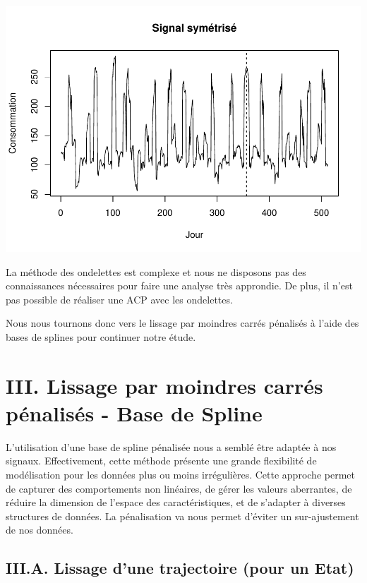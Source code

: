 \documentclass[
]{article}
\begin{document}
\includegraphics{Projet_CHESNAIS_GUIBERT_files/figure-latex/unnamed-chunk-20-2.pdf}

La méthode des ondelettes est complexe et nous ne disposons pas des
connaissances nécessaires pour faire une analyse très approndie. De
plus, il n'est pas possible de réaliser une ACP avec les ondelettes.

Nous nous tournons donc vers le lissage par moindres carrés pénalisés à
l'aide des bases de splines pour continuer notre étude.

\hypertarget{iii.-lissage-par-moindres-carruxe9s-puxe9nalisuxe9s---base-de-spline}{%
\section{III. Lissage par moindres carrés pénalisés - Base de
Spline}\label{iii.-lissage-par-moindres-carruxe9s-puxe9nalisuxe9s---base-de-spline}}

L'utilisation d'une base de spline pénalisée nous a semblé être adaptée
à nos signaux. Effectivement, cette méthode présente une grande
flexibilité de modélisation pour les données plus ou moins irrégulières.
Cette approche permet de capturer des comportements non linéaires, de
gérer les valeurs aberrantes, de réduire la dimension de l'espace des
caractéristiques, et de s'adapter à diverses structures de données. La
pénalisation va nous permet d'éviter un sur-ajustement de nos données.

\hypertarget{iii.a.-lissage-dune-trajectoire-pour-un-etat}{%
\subsection{III.A. Lissage d'une trajectoire (pour un
Etat)}\label{iii.a.-lissage-dune-trajectoire-pour-un-etat}}
\end{document}
